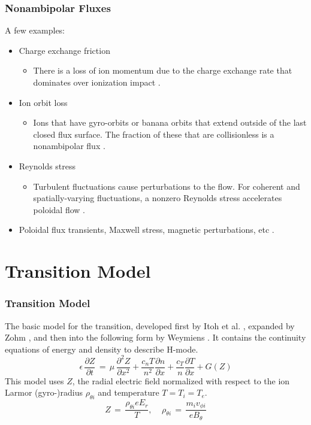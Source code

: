 \documentclass{beamer}
\begin{document}
\begin{frame}
\frametitle{Nonambipolar Fluxes}
A few examples:
\begin{itemize}
	\item Charge exchange friction
	\begin{itemize}
		\item There is a loss of ion momentum due to the charge exchange rate that dominates over ionization impact \cite{toda_condensed_neutrals_1997}.
	\end{itemize}
	\item Ion orbit loss
	\begin{itemize}
		\item Ions that have gyro-orbits or banana orbits that extend outside of the last closed flux surface. The fraction of these that are collisionless is a nonambipolar flux \cite{chankin_loss_1993}.
	\end{itemize}
	\item Reynolds stress
	\begin{itemize}
		\item Turbulent fluctuations cause perturbations to the flow. For coherent and spatially-varying fluctuations, a nonzero Reynolds stress accelerates poloidal flow \cite{diamond_poloidal_1991}.
	\end{itemize}
\item Poloidal flux transients, Maxwell stress, magnetic perturbations, etc \cite{staps_backstepping_2017}.
\end{itemize}
\end{frame}


\section{Transition Model}
\begin{frame}
\frametitle{Transition Model}
	The basic model for the transition, developed first by Itoh et al. \cite{itoh_edge_1991}, expanded by Zohm \cite{zohm_dynamic_1994}, and then into the following form by Weymiens \cite{weymiens_bifurcation_2014}.
It contains the continuity equations of energy and density to describe H-mode.
\begin{equation}
	\epsilon\,\frac{\partial Z}{\partial t} \,=\, \mu\,\frac{\partial^2 Z}{\partial x^2} + \frac{c_n T}{n^2} \frac{\partial n}{\partial x} + \frac{c_T}{n} \frac{\partial T}{\partial x} + G(Z)
	\label{eq:pde}
\end{equation}
This model uses $Z$, the radial electric field normalized with respect to the ion Larmor (gyro-)radius $\rho_{\theta i}$ and temperature $T = T_i = T_e$.
\begin{equation}
	Z \,=\, \frac{\rho_{\theta i} e E_r}{T}, ~~~~~ \rho_{\theta i} \,=\, \frac{m_i v_{\phi i}}{e B_\theta}
	\label{eq:normalization}
\end{equation}
\end{frame}
\end{document}
